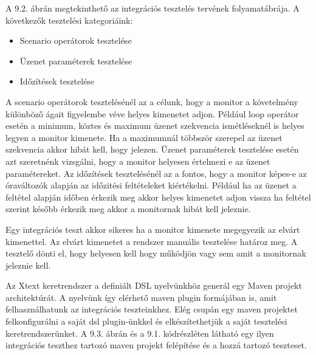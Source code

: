 A 9.2. ábrán megtekinthető az integrációs tesztelés tervének folyamatábrája.
A következők tesztelési kategoriáink:

\begin{itemize}
    \item Scenario operátorok tesztelése
    \item Üzenet paraméterek tesztelése
    \item Időzítések tesztelése
\end{itemize}

A scenario operátorok tesztelésénél az a célunk, hogy a monitor a követelmény különböző ágait figyelembe véve helyes kimenetet adjon.
Például loop operátor esetén a minimum, köztes és maximum üzenet szekvencia ismétléseknél is helyes legyen a monitor kimenete.
Ha a maximumnál többször szerepel az üzenet szekvencia akkor hibát kell, hogy jelezen.
Üzenet paraméterek tesztelése esetén azt szeretnénk vizsgálni, hogy a monitor helyesen értelmezi e az üzenet paramétereket.
Az időzítések tesztelésénél az a fontos, hogy a monitor képes-e az óraváltozók alapján az időzitési feltételeket kiértékelni.
Például ha az üzenet a feltétel alapján időben érkezik meg akkor helyes kimenetet adjon vissza ha feltétel szerint később érkezik meg akkor a monitornak hibát kell jeleznie.

Egy integrációs teszt akkor sikeres ha a monitor kimenete megegyezik az elvárt kimenettel.
Az elvárt kimenetet a rendszer manuális tesztelése határoz meg.
A tesztelő dönti el, hogy helyesen kell hogy működjön vagy sem amit a monitornak jeleznie kell.

\clearpage

Az Xtext keretrendszer a definiált DSL nyelvünkhöz generál egy Maven projekt architektúrát.
A nyelvünk így elérhető maven plugin formájában is, amit felhasználhatunk az integrációs teszteinkhez.
Elég csupán egy maven projektet felkonfigurálni a saját dsl plugin-ünkkel és elkészítethetjük a saját tesztelési keretrendszerünket.
A 9.3. ábrán és a 9.1. kódrészléten látható egy ilyen integrációs teszthez tartozó maven projekt felépítése és a hozzá tartozó teszteset.

